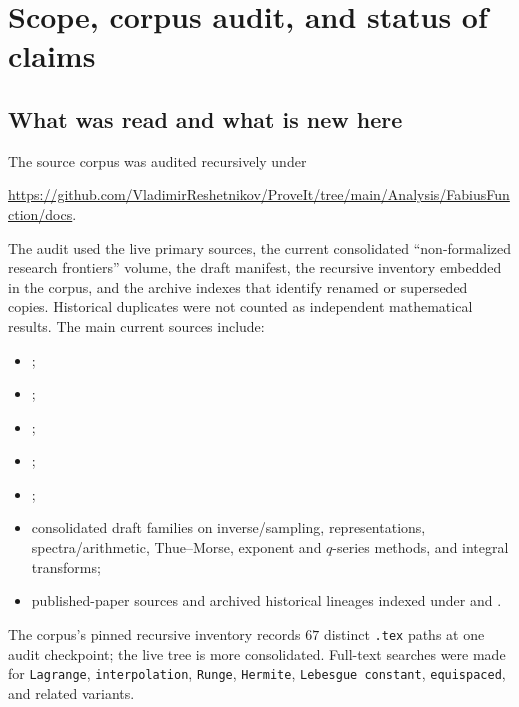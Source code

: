 \documentclass[11pt,oneside]{article}
\theoremstyle{definition}
\theoremstyle{remark}
\begin{document}
\begin{abstract}
Additional exact results include Newton-forward and barycentric forms, a $2$-adic valuation law for the dyadic-comb barycentric weights, an even-polynomial reduction for the full Rvachev comb, and a Lambert-$W$ saddle heuristic for the migration of the error peak.  The report distinguishes proved statements, numerical observations, and conjectures throughout, and ends with alternatives that retain dyadic data without inheriting global Runge instability.
\end{abstract}

\tableofcontents
\newpage

\section{Scope, corpus audit, and status of claims}
\label{sec:audit}

\subsection{What was read and what is new here}

The source corpus was audited recursively under
\begin{center}
\url{https://github.com/VladimirReshetnikov/ProveIt/tree/main/Analysis/FabiusFunction/docs}.
\end{center}
The audit used the live primary sources, the current consolidated ``non-formalized research frontiers'' volume, the draft manifest, the recursive inventory embedded in the corpus, and the archive indexes that identify renamed or superseded copies.  Historical duplicates were not counted as independent mathematical results.  The main current sources include:
\begin{itemize}[leftmargin=2em]
\item {};
\item {};
\item {};
\item {};
\item {};
\item consolidated draft families on inverse/sampling, representations, spectra/arithmetic, Thue--Morse, exponent and $q$-series methods, and integral transforms;
\item published-paper sources and archived historical lineages indexed under  and .
\end{itemize}
The corpus's pinned recursive inventory records $67$ distinct \texttt{.tex} paths at one audit checkpoint; the live tree is more consolidated.  Full-text searches were made for \texttt{Lagrange}, \texttt{interpolation}, \texttt{Runge}, \texttt{Hermite}, \texttt{Lebesgue constant}, \texttt{equispaced}, and related variants.
\end{document}
